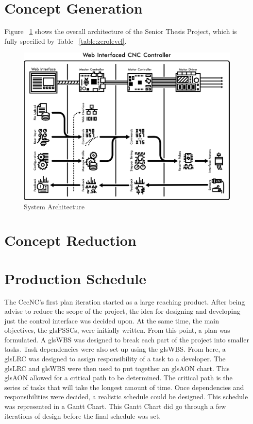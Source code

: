 
\section{Concept Generation}
Figure ~\ref{fig:architecture} shows the overall architecture of the Senior Thesis Project, which is fully specified by Table ~\ref{table:zerolevel}.

\begin{figure}[h]
	\centering
	\includegraphics[width=1\textwidth]{architecture.png}
	\caption{System Architecture}
	\label{fig:architecture}
\end{figure}

\section{Concept Reduction}
\section{Production Schedule}
The CeeNC's first plan iteration started as a large reaching product.
After being advise to reduce the scope of the project, the idea for designing and developing just the control interface was decided upon.
At the same time, the main objectives, the gls{PSSC}s, were initially written.
From this point, a plan was formulated.
A gls{WBS} was designed to break each part of the project into smaller tasks.
Task dependencies were also set up using the gls{WBS}. 
From here, a gls{LRC} was designed to assign responsibility of a task to a developer.
The gls{LRC} and gls{WBS} were then used to put together an gls{AON} chart.
This gls{AON} allowed for a critical path to be determined. 
The critical path is the series of tasks that will take the longest amount of time.
Once dependencies and responsibilities were decided, a realistic schedule could be designed.
This schedule was represented in a Gantt Chart.
This Gantt Chart did go through a few iterations of design before the final schedule was set.

